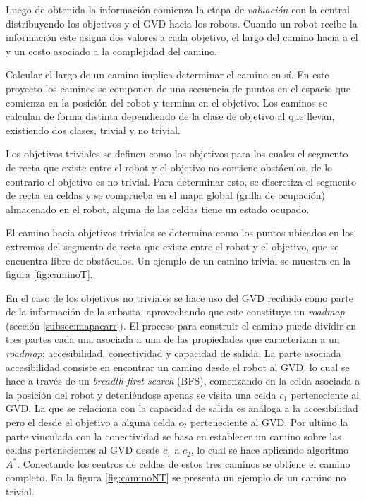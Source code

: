 Luego de obtenida la información comienza la etapa de \emph{valuación}
con la central distribuyendo los objetivos y el GVD hacia los robots. Cuando un
robot recibe la información este asigna dos valores a cada objetivo, el largo
del camino hacia a el y un costo asociado a la complejidad del camino.

Calcular el largo de un camino implica determinar el camino en sí. En este
proyecto los caminos se componen de una secuencia de puntos en el espacio que
comienza en la posición del robot y termina en el objetivo. Los caminos se
calculan de forma distinta dependiendo de la clase de objetivo al que llevan,
existiendo dos clases, trivial y no trivial.

Los objetivos triviales se definen como los objetivos para los cuales el
segmento de recta que existe entre el robot y el objetivo no contiene
obstáculos, de lo contrario el objetivo es no trivial. Para determinar esto, se
discretiza el segmento de recta en celdas \cite{foleyphillips} y se comprueba
en el mapa global (grilla de ocupación) almacenado en el robot, alguna de las
celdas tiene un estado ocupado. 

El camino hacia objetivos triviales se determina como los puntos ubicados en
los extremos del segmento de recta que existe entre el robot y el objetivo, que
se encuentra libre de obstáculos. Un ejemplo de un camino trivial se muestra
en la figura \ref{fig:caminoT}.

En el caso de los objetivos no triviales se hace uso del GVD recibido como
parte de la información de la subasta, aprovechando que este constituye un
\emph{roadmap} (sección \ref{subsec:mapacarr}). El proceso para construir el
camino puede dividir en tres partes cada una asociada a una de las propiedades
que caracterizan a un \emph{roadmap}: accesibilidad, conectividad y capacidad
de salida. La parte asociada accesibilidad consiste en encontrar un camino
desde el robot al GVD, lo cual se hace a través de un \emph{breadth-first
search} (BFS), comenzando en la celda asociada a la posición del robot y
deteniéndose apenas se visita una celda $c_1$ perteneciente al GVD. La que se
relaciona con la capacidad de salida es análoga a la accesibilidad pero el
desde el objetivo a alguna celda $c_2$ perteneciente al GVD. Por ultimo la parte
vinculada con la conectividad se basa en establecer un camino sobre las celdas
pertenecientes al GVD desde $c_1$ a $c_2$, lo cual se hace aplicando algoritmo
$A^*$. Conectando los centros de celdas de estos tres caminos se obtiene el
camino completo. En la figura \ref{fig:caminoNT} se presenta un ejemplo de un
camino no trivial.

